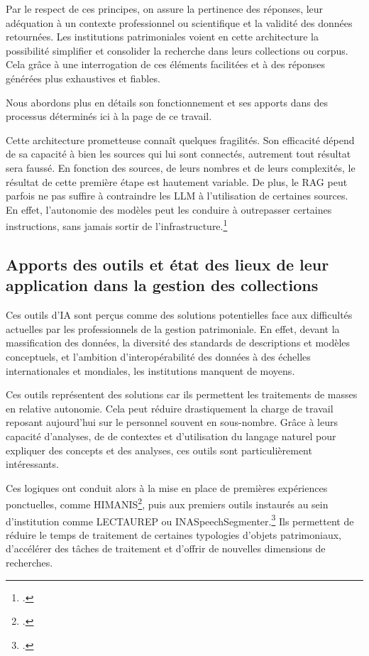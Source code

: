 Par le respect de ces principes, on assure la pertinence des réponses, leur adéquation à un contexte professionnel ou scientifique et la validité des données retournées. Les institutions patrimoniales voient en cette architecture la possibilité simplifier et consolider la recherche dans leurs collections ou corpus. Cela grâce à une interrogation de ces éléments facilitées et à des réponses générées plus exhaustives et fiables. 

Nous abordons plus en détails son fonctionnement et ses apports dans des processus déterminés ici à la page \pageref{procrag} de ce travail.\newline

Cette architecture prometteuse connaît quelques fragilités. Son efficacité dépend de sa capacité à bien  les sources qui lui sont connectés, autrement tout résultat sera faussé. En fonction des sources, de leurs nombres et de leurs complexités, le résultat de cette première étape est hautement variable. De plus, le \gls{RAG} peut parfois ne pas suffire à contraindre les \gls{LLM} à l'utilisation de certaines sources. En effet, l'autonomie des modèles peut les conduire à outrepasser certaines instructions, sans jamais sortir de l'infrastructure.\footcite{gaoRetrievalAugmentedGenerationLarge2024}

\subsection{Apports des outils et état des lieux de leur application dans la gestion des collections}

Ces outils d'\gls{IA} sont perçus comme des solutions potentielles face aux difficultés actuelles par les professionnels de la gestion patrimoniale. En effet, devant la massification des données, la diversité des standards de descriptions et modèles conceptuels, et l'ambition d'interopérabilité des données à des échelles internationales et mondiales, les institutions manquent de moyens. 

Ces outils représentent des solutions car ils permettent les traitements de masses en relative autonomie. Cela peut réduire drastiquement la charge de travail reposant aujourd'hui sur le personnel souvent en sous-nombre. Grâce à leurs capacité d'analyses, de  de contextes et d'utilisation du langage naturel pour expliquer des concepts et des analyses, ces outils sont particulièrement intéressants. 

Ces logiques ont conduit alors à la mise en place de premières expériences ponctuelles, comme HIMANIS\footcite{stutzmannRecherchePleinTexte2017/dec./15}, puis aux premiers outils instaurés au sein d'institution comme LECTAUREP ou INASpeechSegmenter.\footcite{lezerInaSpeechSegmenterDecompteTemps} Ils permettent de réduire le temps de traitement de certaines typologies d'objets patrimoniaux, d'accélérer des tâches de traitement et d'offrir de nouvelles dimensions de recherches.\newline

